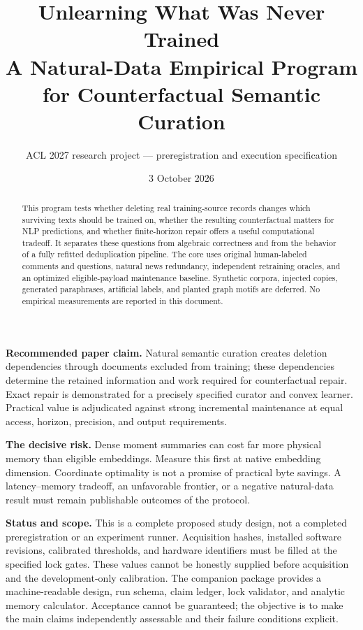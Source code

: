 \documentclass[11pt,a4paper]{article}
\title{\color{ink}\textbf{Unlearning What Was Never Trained}\\[7pt]\Large A Natural-Data Empirical Program\\for Counterfactual Semantic Curation}
\author{ACL 2027 research project --- preregistration and execution specification}
\date{3 October 2026}
\begin{document}
\maketitle
\begin{abstract}
This program tests whether deleting real training-source records changes which surviving texts should be trained on, whether the resulting counterfactual matters for NLP predictions, and whether finite-horizon repair offers a useful computational tradeoff. It separates these questions from algebraic correctness and from the behavior of a fully refitted deduplication pipeline. The core uses original human-labeled comments and questions, natural news redundancy, independent retraining oracles, and an optimized eligible-payload maintenance baseline. Synthetic corpora, injected copies, generated paraphrases, artificial labels, and planted graph motifs are deferred. No empirical measurements are reported in this document.
\end{abstract}

\textbf{Recommended paper claim.} Natural semantic curation creates deletion dependencies through documents excluded from training; these dependencies determine the retained information and work required for counterfactual repair. Exact repair is demonstrated for a precisely specified curator and convex learner. Practical value is adjudicated against strong incremental maintenance at equal access, horizon, precision, and output requirements.

\textbf{The decisive risk.} Dense moment summaries can cost far more physical memory than eligible embeddings. Measure this first at native embedding dimension. Coordinate optimality is not a promise of practical byte savings. A latency--memory tradeoff, an unfavorable frontier, or a negative natural-data result must remain publishable outcomes of the protocol.

\textbf{Status and scope.} This is a complete proposed study design, not a completed preregistration or an experiment runner. Acquisition hashes, installed software revisions, calibrated thresholds, and hardware identifiers must be filled at the specified lock gates. These values cannot be honestly supplied before acquisition and the development-only calibration. The companion package provides a machine-readable design, run schema, claim ledger, lock validator, and analytic memory calculator. Acceptance cannot be guaranteed; the objective is to make the main claims independently assessable and their failure conditions explicit.
\end{document}
